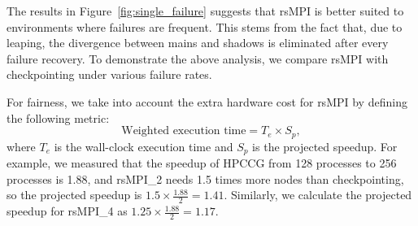 The results in Figure~\ref{fig:single_failure} suggests that rsMPI is better suited to environments where failures are frequent. 
This stems from the fact that, due to leaping, the divergence between mains and shadows is eliminated after every failure recovery. %
To demonstrate the above analysis, we compare rsMPI with checkpointing under various failure rates. 

For fairness, we take into account the extra hardware cost for rsMPI by defining the following metric:
$$\text{Weighted execution time} = T_e \times S_p,$$ where $T_e$ is the wall-clock execution time and $S_p$ is the projected speedup. For example, we measured that the speedup of HPCCG from 128 processes to 256 processes is 1.88, and rsMPI\_2 needs 1.5 times more nodes than checkpointing, so the projected speedup is $1.5\times\frac{1.88}{2}=1.41$. Similarly, we calculate the projected speedup for rsMPI\_4 as $1.25\times\frac{1.88}{2}=1.17$.


